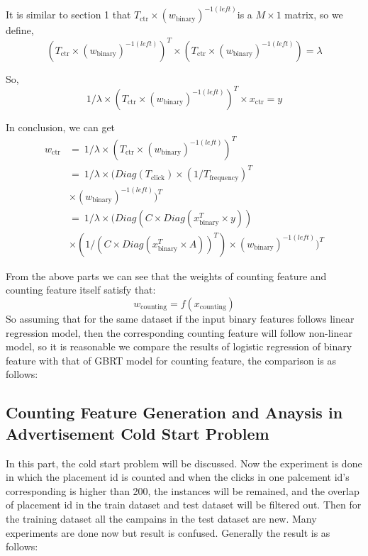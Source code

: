 \documentclass{sig-alternate}
\begin{document}
It is similar to section 1 that \(T_{\text{ctr}} \times (w_{\text{binary}})^{-1(left)}\)is a \(M \times 1\) matrix, so we define, 
\begin{equation}
(T_{\text{ctr}} \times (w_{\text{binary}})^{-1(left)})^T \times (T_{\text{ctr}} \times (w_{\text{binary}})^{-1(left)}) = \lambda
\end{equation}

So, 
\begin{equation}
1/{\lambda} \times (T_{\text{ctr}} \times (w_{\text{binary}})^{-1(left)})^T \times x_{\text{ctr}} =  y
\end{equation}

In conclusion, we can get
\begin{equation} 
\begin{split}
w_{\text{ctr}} & =\ 1/{\lambda} \times (T_{\text{ctr}} \times (w_{\text{binary}})^{-1(left)})^T \\
& = \ 1/{\lambda} \times (Diag(T_{\text{click}}) \times (1/T_{\text{frequency}} )^T \\ 
& \times (w_{\text{binary}})^{-1(left)})^T \\
& = \ 1/{\lambda} \times (Diag(C \times Diag(x_{\text{binary}}^T \times y)) \\ 
& \times (1/ (C \times Diag(x_{\text{binary}}^T \times A) )^T) \times (w_{\text{binary}})^{-1(left)})^T
\end{split}
\end{equation}


From the above parts we can see that the weights of counting feature and counting feature itself satisfy that:
\begin{equation}
w_{\text{counting}} = f(x_{\text{counting}})
\end{equation}
So assuming that for the same dataset if the input binary features follows linear regression model, then the corresponding counting feature will follow non-linear model, so it is reasonable we compare the results of logistic regression of binary feature with that of GBRT model for counting feature, the comparison is as follows:


\subsection{Counting Feature Generation and Anaysis in Advertisement Cold Start Problem}
In this part, the cold start problem will be discussed. Now the experiment is done in which the placement id is counted and when the clicks in one palcement id's corresponding is higher than 200, the instances will be remained, and the overlap of placement id in the train dataset and test dataset will be filtered out. Then for the training dataset all the campains in the test dataset are new. Many experiments are done now but result is confused. Generally the result is as follows: 
\end{document}
